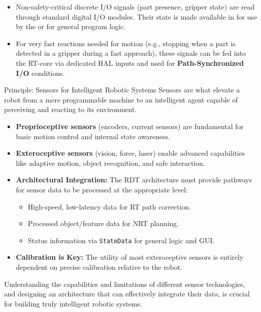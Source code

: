 \begin{itemize}
\begin{itemize}
                \item Non-safety-critical discrete I/O signals (part presence, gripper state) are read through standard digital I/O modules. Their state is made available in  for use by the  or  for general program logic.
                \item For very fast reactions needed for motion (e.g., stopping when a part is detected in a gripper during a fast approach), these signals can be fed into the RT-core via dedicated HAL inputs and used for \textbf{Path-Synchronized I/O} conditions.
            \end{itemize}
    \end{itemize}




\begin{principlebox}{Principle: Sensors for Intelligent Robotic Systems}
Sensors are what elevate a robot from a mere programmable machine to an intelligent agent capable of perceiving and reacting to its environment.
\begin{itemize}
    \item \textbf{Proprioceptive sensors} (encoders, current sensors) are fundamental for basic motion control and internal state awareness.
    \item \textbf{Exteroceptive sensors} (vision, force, laser) enable advanced capabilities like adaptive motion, object recognition, and safe interaction.
    \item \textbf{Architectural Integration:} The RDT architecture must provide pathways for sensor data to be processed at the appropriate level:
        \begin{itemize}
            \item High-speed, low-latency data for RT path correction.
            \item Processed object/feature data for NRT planning.
            \item Status information via \texttt{StateData} for general logic and GUI.
        \end{itemize}
    \item \textbf{Calibration is Key:} The utility of most exteroceptive sensors is entirely dependent on precise calibration relative to the robot.
\end{itemize}
Understanding the capabilities and limitations of different sensor technologies, and designing an architecture that can effectively integrate their data, is crucial for building truly intelligent robotic systems.
\end{principlebox}

